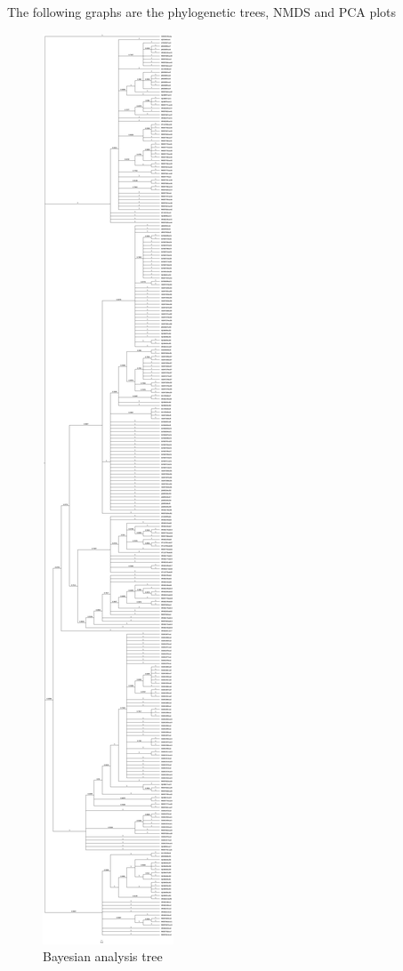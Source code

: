 The following graphs are the phylogenetic trees, NMDS and PCA plots

\begin{figure}[htbp]
\centering
\includegraphics[keepaspectratio,width=\textwidth,height=0.75\textheight]{images/mcmc.jpg}
\caption{Bayesian analysis tree}
\end{figure}

